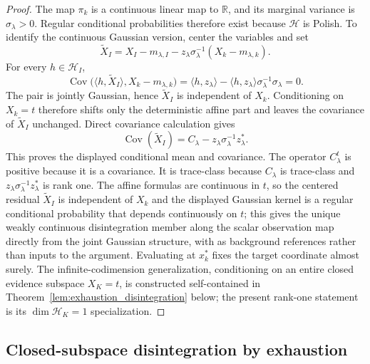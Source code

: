 \begin{proof}
The map $\pi_k$ is a continuous linear map to $\mathbb{R}$, and its marginal
variance is $\sigma_\lambda>0$.  Regular conditional probabilities therefore
exist because $\mathcal{H}$ is Polish.  To identify the continuous Gaussian
version, center the variables and set
\[
  \widetilde X_I
  =X_I-m_{\lambda,I}-z_\lambda\sigma_\lambda^{-1}(X_k-m_{\lambda,k}).
\]
For every $h\in\mathcal{H}_I$,
\[
  \operatorname{Cov}\bigl(\langle h,\widetilde X_I\rangle,
  X_k-m_{\lambda,k}\bigr)
  =\langle h,z_\lambda\rangle
   -\langle h,z_\lambda\rangle\sigma_\lambda^{-1}\sigma_\lambda
  =0.
\]
The pair is jointly Gaussian, hence $\widetilde X_I$ is independent of $X_k$.
Conditioning on $X_k=t$ therefore shifts only the deterministic affine part and
leaves the covariance of $\widetilde X_I$ unchanged.  Direct covariance
calculation gives
\[
  \operatorname{Cov}(\widetilde X_I)
  =C_\lambda-z_\lambda\sigma_\lambda^{-1}z_\lambda^*.
\]
This proves the displayed conditional mean and covariance.  The operator
$C_\lambda^t$ is positive because it is a covariance.  It is trace-class because
$C_\lambda$ is trace-class and $z_\lambda\sigma_\lambda^{-1}z_\lambda^*$ is
rank one.  The affine formulas are continuous in $t$, so the centered residual
$\widetilde X_I$ is independent of $X_k$ and the displayed Gaussian kernel is a
regular conditional probability that depends continuously on $t$; this gives the
unique weakly continuous disintegration member along the scalar observation map
directly from the joint Gaussian structure, with
\cite{bogachev1998gaussian,lagatta2013continuous,steinwart2024conditioning,chen2024gaussian}
as background references rather than inputs to the argument.  Evaluating at
$x_k^*$ fixes the target coordinate almost surely.  The infinite-codimension
generalization, conditioning on an entire closed evidence subspace
$X_K=t$, is constructed self-contained in
Theorem~\ref{lem:exhaustion_disintegration} below; the present rank-one statement
is its $\dim\mathcal{H}_K=1$ specialization.
\end{proof}

\subsection{Closed-subspace disintegration by exhaustion}
\label{subsec:closed_subspace_disintegration}

